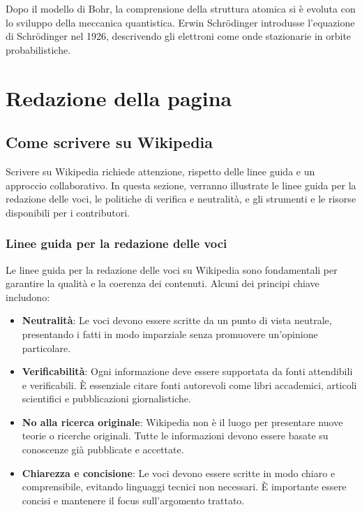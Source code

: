 \documentclass[12pt,a4paper]{report}
\begin{document}
Dopo il modello di Bohr, la comprensione della struttura atomica si è evoluta con lo sviluppo della meccanica quantistica. Erwin Schrödinger introdusse l'equazione di Schrödinger nel 1926, descrivendo gli elettroni come onde stazionarie in orbite probabilistiche.

\chapter{Redazione della pagina}
\section{Come scrivere su Wikipedia}

Scrivere su Wikipedia richiede attenzione, rispetto delle linee guida e un approccio collaborativo. In questa sezione, verranno illustrate le linee guida per la redazione delle voci, le politiche di verifica e neutralità, e gli strumenti e le risorse disponibili per i contributori.

\subsection{Linee guida per la redazione delle voci}

Le linee guida per la redazione delle voci su Wikipedia sono fondamentali per garantire la qualità e la coerenza dei contenuti. Alcuni dei principi chiave includono:

\begin{itemize}
    \item \textbf{Neutralità}: Le voci devono essere scritte da un punto di vista neutrale, presentando i fatti in modo imparziale senza promuovere un'opinione particolare.
    \item \textbf{Verificabilità}: Ogni informazione deve essere supportata da fonti attendibili e verificabili. È essenziale citare fonti autorevoli come libri accademici, articoli scientifici e pubblicazioni giornalistiche.
    \item \textbf{No alla ricerca originale}: Wikipedia non è il luogo per presentare nuove teorie o ricerche originali. Tutte le informazioni devono essere basate su conoscenze già pubblicate e accettate.
    \item \textbf{Chiarezza e concisione}: Le voci devono essere scritte in modo chiaro e comprensibile, evitando linguaggi tecnici non necessari. È importante essere concisi e mantenere il focus sull'argomento trattato.
\end{itemize}
\end{document}
